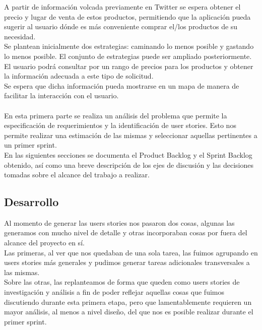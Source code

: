 \documentclass[a4paper,8pt]{article}
\begin{document}
A partir de información volcada previamente en Twitter se espera obtener el precio y lugar de venta de estos productos, permitiendo que la aplicación pueda sugerir al usuario dónde es más conveniente comprar el/los productos de su necesidad.\\

Se plantean inicialmente dos estrategias: caminando lo menos posible y gastando lo menos posible. El conjunto de estrategias puede ser ampliado posteriormente.\\
El usuario podrá consultar por un rango de precios para los productos y obtener la información adecuada a este tipo de solicitud. \\

Se espera que dicha información pueda mostrarse en un mapa de manera de facilitar la interacción con el usuario.\\\\

En esta primera parte se realiza un análisis del problema que permite la especificación de requerimientos y la identificación de user stories. Esto nos permite realizar una estimación de las mismas y seleccionar aquellas pertinentes a un primer sprint.\\

En las siguientes secciones se documenta el Product Backlog y el Sprint Backlog obtenido, así como una breve descripción de los ejes de discusión y las decisiones tomadas sobre el alcance del trabajo a realizar.\\

\subsection{Desarrollo}
Al momento de generar las users stories nos pasaron dos cosas, algunas las generamos con mucho nivel de detalle y otras incorporaban cosas por fuera del alcance del proyecto en sí. \\
Las primeras, al ver que nos quedaban de una sola tarea, las fuimos agrupando en users stories más generales y pudimos generar tareas adicionales transversales a las mismas.\\
Sobre las otras, las replanteamos de forma que queden como users stories de investigación y análisis a fin de poder reflejar aquellas cosas que fuimos discutiendo durante esta primera etapa, pero que lamentablemente requieren un mayor análisis, al menos a nivel diseño, del que nos es posible realizar durante el primer sprint. 
\end{document}
